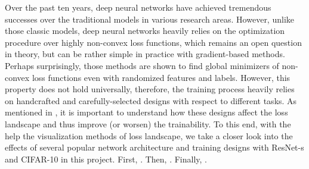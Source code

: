 


Over the past ten years, deep neural networks have achieved tremendous successes over the traditional models in various research areas.  
However, unlike those classic models, deep neural networks heavily relies on the optimization procedure over highly non-convex loss functions, which remains an open question in theory, but can be rather simple in practice with gradient-based methods.  
Perhaps surprisingly, those methods are shown to find global minimizers of non-convex loss functions even with randomized features and labels. 
However, this property does not hold universally, therefore, the training process heavily relies on handcrafted and carefully-selected designs with respect to different tasks. 
As mentioned in \cite{li2018visualizing}, it is important to understand how these designs affect the loss landscape and thus improve (or worsen) the trainability. 
To this end, with the help the visualization methods of loss landscape,  we take a closer look into the effects of several popular network architecture and training designs with ResNet-s and CIFAR-10 in this project.  
First, .
Then, .
Finally, .
